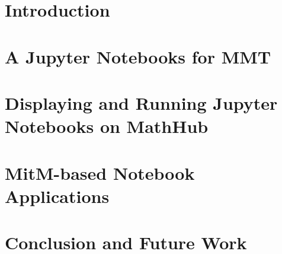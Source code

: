 \documentclass{deliverablereport}
\author{Kai Amann, Michael Kohlhase, Florian Rabe, Tom Wiesing}
\begin{document}
\maketitle
\begin{abstract}\strut\\\end{abstract}


\setcounter{tocdepth}{2}
\tableofcontents
\clearpage

\section{Introduction}\label{sec:intro}


\section[MMT Notebooks]{A Jupyter Notebooks for MMT}\label{sec:mmt-jp}


\section[Notebooks on MathHub]{Displaying and Running Jupyter Notebooks on MathHub}\label{sec:nb-mh}


\section{MitM-based Notebook Applications}\label{sec:mitm-nb}


\section{Conclusion and Future Work}\label{sec:concl}


\printbibliography
\end{document}

